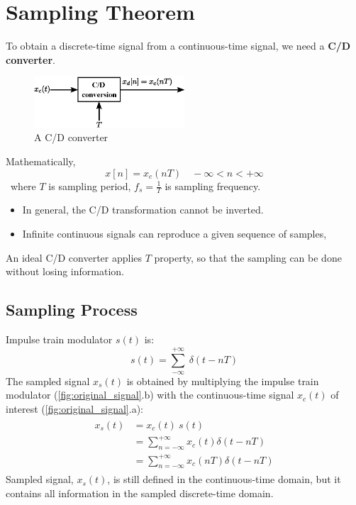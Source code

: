 \section{Sampling Theorem}

To obtain a discrete-time signal from a continuous-time signal, we need a \textbf{C/D converter}.
 \begin{figure}[H]
     \centering
     \includegraphics[width = 0.5\textwidth]{images/CD_converter.eps}
     \caption{A C/D converter} 
 \end{figure}
Mathematically,
\[ x[n] = x_{c}(nT) \quad -\infty < n < +\infty \]
\ where $T$ is sampling period, $f_{s} = \frac{1}{T}$ is sampling frequency. 
\begin{itemize}
\item In general, the C/D transformation cannot be inverted.
\item Infinite continuous signals can reproduce a given sequence of samples,
\end{itemize}
An ideal C/D converter applies $T$ property, so that the sampling can be done without losing information. 

\subsection{Sampling Process}
Impulse train modulator $s(t)$ is: 
\[ s(t) = \sum_{-\infty}^{+\infty} \ \delta(t-nT) \]
The sampled signal $x_{s}(t)$ is obtained by multiplying the impulse train modulator (\autoref{fig:original_signal}.b) with the continuous-time signal $x_{c}(t)$ of interest (\autoref{fig:original_signal}.a):
\begin{align*} 
\begin{split}
x_{s}(t) &= x_{c}(t) \ s(t)\\
&= \sum_{n=-\infty}^{+\infty} x_{c}(t) \delta(t-nT)\\
&= \sum_{n=-\infty}^{+\infty} x_{c}(nT) \delta(t-nT)
\end{split}
\end{align*}
Sampled signal, $x_{s}(t)$, is still defined in the continuous-time domain, but it contains all information in the sampled discrete-time domain.\\\\


